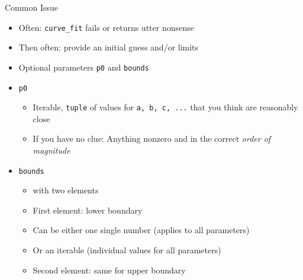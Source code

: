 
\begin{frame}{Common Issue}
%
\begin{itemize}
\item Often: \texttt{curve\_fit} fails or returns utter nonsense
\item Then often: provide an initial guess and/or limits
\item Optional parameters \texttt{p0} and \texttt{bounds}
\item \texttt{p0}
	\begin{itemize}
	\item Iterable, \eg \texttt{tuple} of values for \texttt{a, b, c, ...} that you think are reasonably close
	\item If you have no clue: Anything nonzero and in the correct \emph{order of magnitude}
	\end{itemize}
\item \texttt{bounds}
	\begin{itemize}
	\item {} with two elements
	\item First element: lower boundary
	\item Can be either one single number (applies to all parameters)
	\item Or an iterable (individual values for all parameters)
	\item Second element: same for upper boundary
	\end{itemize}
\end{itemize}
%
\end{frame}



